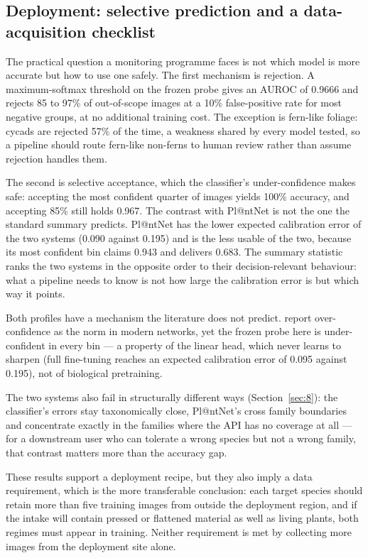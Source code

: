 \documentclass[preprint,12pt,authoryear]{elsarticle}
\begin{document}
\setcounter{section}{10}

\setcounter{subsection}{2}

\subsection{Deployment: selective prediction and a data-acquisition checklist}\label{sec:10.3}

The practical question a monitoring programme faces is not which model is more accurate but how to use one safely. The first mechanism is rejection. A maximum-softmax threshold on the frozen probe gives an AUROC of 0.9666 and rejects 85 to 97\% of out-of-scope images at a 10\% false-positive rate for most negative groups, at no additional training cost. The exception is fern-like foliage: cycads are rejected 57\% of the time, a weakness shared by every model tested, so a pipeline should route fern-like non-ferns to human review rather than assume rejection handles them.

The second is selective acceptance, which the classifier's under-confidence makes safe: accepting the most confident quarter of images yields 100\% accuracy, and accepting 85\% still holds 0.967. The contrast with Pl@ntNet is not the one the standard summary predicts. Pl@ntNet has the lower expected calibration error of the two systems (0.090 against 0.195) and is the less usable of the two, because its most confident bin claims 0.943 and delivers 0.683. The summary statistic ranks the two systems in the opposite order to their decision-relevant behaviour: what a pipeline needs to know is not how large the calibration error is but which way it points.

Both profiles have a mechanism the literature does not predict. \citet{guo2017} report over-confidence as the norm in modern networks, yet the frozen probe here is under-confident in every bin --- a property of the linear head, which never learns to sharpen (full fine-tuning reaches an expected calibration error of 0.095 against 0.195), not of biological pretraining.

The two systems also fail in structurally different ways (Section~\ref{sec:8}): the classifier's errors stay taxonomically close, Pl@ntNet's cross family boundaries and concentrate exactly in the families where the API has no coverage at all --- for a downstream user who can tolerate a wrong species but not a wrong family, that contrast matters more than the accuracy gap.

These results support a deployment recipe, but they also imply a data requirement, which is the more transferable conclusion: each target species should retain more than five training images from outside the deployment region, and if the intake will contain pressed or flattened material as well as living plants, both regimes must appear in training. Neither requirement is met by collecting more images from the deployment site alone.
\end{document}
